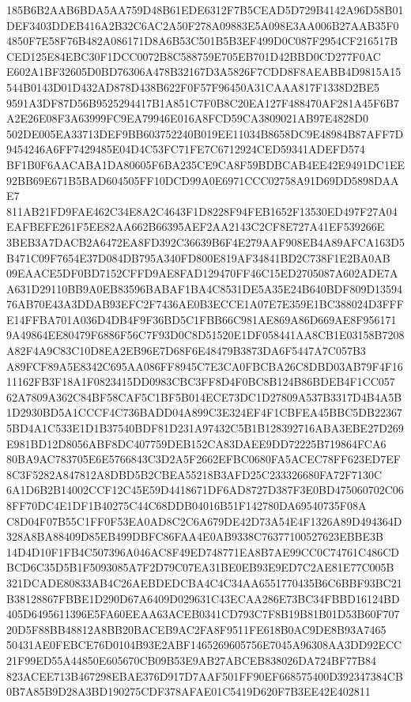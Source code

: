 \documentclass[UTF8,fontset=fandol,zihao=-4,a4paper]{ctexart}
\begin{document}
{{185B6B2AAB6BDA5AA759D48B61EDE6312F7B5CEAD5D729B4142A96D58B01DEF3403DDEB416A2B32C6AC2A50F278A09883E5A098E3AA006B27AAB35F0
4850F7E58F76B482A086171D8A6B53C501B5B3EF499D0C087F2954CF216517BCED125E84EBC30F1DCC0072B8C588759E705EB701D42BBD0CD277F0AC
E602A1BF32605D0BD76306A478B32167D3A5826F7CDD8F8AEABB4D9815A15544B0143D01D432AD878D438B622F0F57F96450A31CAAA817F1338D2BE5
9591A3DF87D56B9525294417B1A851C7F0B8C20EA127F488470AF281A45F6B7A2E26E08F3A63999FC9EA79946E016A8FCD59CA3809021AB97E4828D0
502DE005EA33713DEF9BB603752240B019EE11034B8658DC9E48984B87AFF7D9454246A6FF7429485E04D4C53FC71FE7C6712924CED59341ADEFD574
BF1B0F6AACABA1DA80605F6BA235CE9CA8F59BDBCAB4EE42E9491DC1EE92BB69E671B5BAD604505FF10DCD99A0E6971CCC02758A91D69DD5898DAAE7
811AB21FD9FAE462C34E8A2C4643F1D8228F94FEB1652F13530ED497F27A04EAFBEFE261F5EE82AA662B66395AEF2AA2143C2CF8E727A41EF539266E
3BEB3A7DACB2A6472EA8FD392C36639B6F4E279AAF908EB4A89AFCA163D5B471C09F7654E37D084DB795A340FD800E819AF34841BD2C738F1E2BA0AB
09EAACE5DF0BD7152CFFD9AE8FAD129470FF46C15ED2705087A602ADE7AA631D29110BB9A0EB83596BABAF1BA4C8531DE5A35E24B640BDF809D13594
76AB70E43A3DDAB93EFC2F7436AE0B3ECCE1A07E7E359E1BC388024D3FFFE14FFBA701A036D4DB4F9F36BD5C1FBB66C981AE869A86D669AE8F956171
9A49864EE80479F6886F56C7F93D0C8D51520E1DF058441AA8CB1E03158B7208A82F4A9C83C10D8EA2EB96E7D68F6E48479B3873DA6F5447A7C057B3
A89FCF89A5E8342C695AA086FF8945C7E3CA0FBCBA26C8DBD03AB79F4F1611162FB3F18A1F0823415DD0983CBC3FF8D4F0BC8B124B86BDEB4F1CC057
62A7809A362C84BF58CAF5C1BF5B014ECE73DC1D27809A537B3317D4B4A5B1D2930BD5A1CCCF4C736BADD04A899C3E324EF4F1CBFEA45BBC5DB22367
5BD4A1C533E1D1B37540BDF81D231A97432C5B1B128392716ABA3EBE27D269E981BD12D8056ABF8DC407759DEB152CA83DAEE9DD72225B719864FCA6
80BA9AC783705E6E5766843C3D2A5F2662EFBC0680FA5ACEC78FF623ED7EF8C3F5282A847812A8DBD5B2CBEA55218B3AFD25C233326680FA72F7130C
6A1D6B2B14002CCF12C45E59D4418671DF6AD8727D387F3E0BD475060702C068FF70DC4E1DF1B40275C44C68DDB04016B51F142780DA69540735F08A
C8D04F07B55C1FF0F53EA0AD8C2C6A679DE42D73A54E4F1326A89D494364D328A8BA88409D85EB499DBFC86FAA4E0AB9338C76377100527623EBBE3B
14D4D10F1FB4C507396A046AC8F49ED748771EA8B7AE99CC0C74761C486CDBCD6C35D5B1F5093085A7F2D79C07EA31BE0EB93E9ED7C2AE81E77C005B
321DCADE80833AB4C26AEBDEDCBA4C4C34AA6551770435B6C6BBF93BC21B38128867FBBE1D290D67A6409D029631C43ECAA286E73BC34FBBD16124BD
405D6495611396E5FA60EEAA63ACEB0341CD793C7F8B19B81B01D53B60F70720D5F88BB48812A8BB20BACEB9AC2FA8F9511FE618B0AC9DE8B93A7465
50431AE0FEBCE76D0104B93E2ABF1465269605756E7045A96308AA3DD92ECC21F99ED55A44850E605670CB09B53E9AB27ABCEB838026DA724BF77B84
823ACEE713B467298EBAE376D917D7AAF501FF90EF668575400D392347384CB0B7A85B9D28A3BD190275CDF378AFAE01C5419D620F7B3EE42E402811
}}
\end{document}
